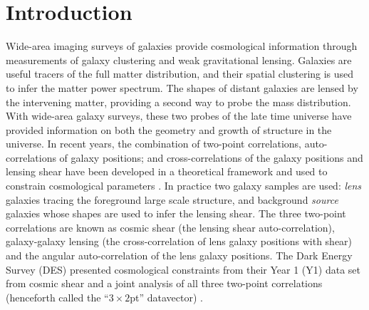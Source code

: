 \documentclass[aps, prd,twocolumn,superscriptaddress,nofootinbib,preprintnumbers]{revtex4-1}
\newcommand{\IR}[1]{{\color{red}[\textbf{Note for IR}: #1]}}
\begin{document}



\section{Introduction}
\label{sec:intro}

Wide-area imaging surveys of galaxies provide cosmological information through measurements of galaxy clustering and weak gravitational lensing. Galaxies are useful tracers of the full matter distribution, and their spatial clustering is used to infer the matter power spectrum. The shapes of distant galaxies are lensed by the intervening matter, providing a second way to probe the mass distribution. With wide-area galaxy surveys, these two probes of the late time universe have provided  information on both the geometry and growth of structure in the universe. 
In recent years, the combination of two-point correlations, auto-correlations of galaxy positions; and cross-correlations of the galaxy positions and lensing shear have been developed in a theoretical framework \citep{Cacciato_2009,Baldauf_2010,Cacciato_2012,van_den_Bosch_2013} and used to constrain cosmological parameters  \citep{Cacciato_2013,Mandelbaum_2013,Kwan_2016,More_2015,Dvornik_2018,Coupon_2015}. In practice two galaxy samples are used:  {\it lens} galaxies tracing the foreground large scale structure, and background {\it source} galaxies whose shapes are used to infer the lensing shear. The three two-point correlations are known as cosmic shear (the lensing shear auto-correlation), galaxy-galaxy lensing (the cross-correlation of lens galaxy positions with shear) and the angular auto-correlation of the lens galaxy positions.
The Dark Energy Survey (DES) presented cosmological constraints from their Year 1 (Y1) data set from cosmic shear \citep{Troxel_2018} and a joint analysis of all three two-point correlations (henceforth called the ``$3\times2$pt'' datavector) \citep{Abbott_2018}. 
\end{document}
